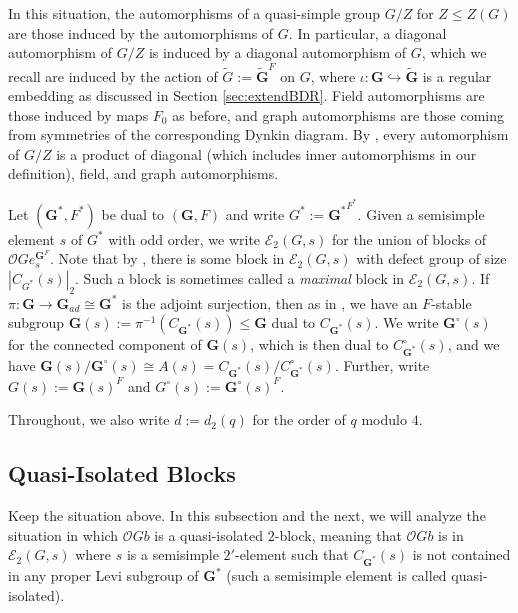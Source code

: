 \documentclass{amsart}
\theoremstyle{plain}\newtheorem{Theorem}{Theorem}[section]
\theoremstyle{plain}\newtheorem{Conjecture}[Theorem]{Conjecture}
\theoremstyle{plain}\newtheorem{Corollary}[Theorem]{Corollary}
\theoremstyle{plain}\newtheorem{Lemma}[Theorem]{Lemma}
\theoremstyle{plain}\newtheorem{Proposition}[Theorem]{Proposition}
\theoremstyle{definition}\newtheorem{Definition}[Theorem]{Definition}
\theoremstyle{definition}\newtheorem{Example}[Theorem]{Example}
\theoremstyle{definition}\newtheorem{Examples}[Theorem]{Examples}
\theoremstyle{definition}\newtheorem{Exercise}[Theorem]{Exercise}
\theoremstyle{definition}\newtheorem{Notation}[Theorem]{Notation}
\theoremstyle{definition}\newtheorem{Remark}[Theorem]{Remark}
\theoremstyle{definition}\newtheorem{Remarks}[Theorem]{Remarks}
\def\CO{{\mathcal{O}}}    \def\OPE{{\mathcal{O}(P\rtimes E)}}
\newcommand{\bG}{{\mathbf{G}}}
\newcommand{\wt}{\widetilde}
\newcommand{\cent} {C}
\newcommand{\zent} {Z}
\numberwithin{equation}{section}
\begin{document}
In this situation, the automorphisms of a quasi-simple group $G/Z$ for $Z\leq \zent(G)$ are those induced by the automorphisms of $G$. In particular, a diagonal automorphism of $G/Z$ is induced by a diagonal automorphism of $G$, which we recall are induced by the action of $\wt{G}:=\wt\bG^F$ on $G$, where $\iota\colon\bG\hookrightarrow\wt\bG$ is a regular embedding as discussed in Section \ref{sec:extendBDR}.
Field automorphisms are those induced by maps $F_0$ as before, and graph automorphisms are those coming from symmetries of the corresponding Dynkin diagram. 
By \cite[Thm.~2.5.12]{GLS3}, every automorphism of $G/Z$ is a product of  diagonal (which includes inner automorphisms in our definition), field, and graph automorphisms.



Let $(\bG^\ast, F^\ast)$ be dual to $(\bG, F)$ and write $G^\ast:={\bG^\ast}^{F^\ast}$. Given a semisimple element $s$ of $G^\ast$ with odd order, we write $\mathcal{E}_2(G, s)$ for the union of blocks of $\CO G e_s^{\bG^F}$. 
Note that by \cite[Prop.~2.6]{KM13}, there is some block in $\mathcal{E}_2(G, s)$ with defect group of size $|\cent_{G^\ast}(s)|_2$. Such a block is sometimes called a \emph{maximal} block in $\mathcal{E}_2(G, s)$. If $\pi\colon \bG\rightarrow\bG_{ad}\cong \bG^\ast$ is the adjoint surjection, then as in \cite[Sec.~2.2]{Ruh25}, we have an $F$-stable subgroup $\bG(s):=\pi^{-1}(\cent_{\bG^\ast}(s))\leq \bG$ dual to $\cent_{\bG^\ast}(s)$. We write $\bG^\circ(s)$ for the connected component of $\bG(s)$, which is then dual to $\cent_{\bG^\ast}^\circ(s)$, and we have $\bG(s)/\bG^\circ(s)\cong A(s)=\cent_{\bG^\ast}(s)/\cent_{\bG^\ast}^\circ(s)$. Further, write $G(s):=\bG(s)^F$ and $G^\circ(s):=\bG^\circ(s)^F$. 

Throughout, we also write $d:=d_2(q)$ for the order of $q$ modulo $4$.

\subsection{Quasi-Isolated Blocks}\label{sec:quasiisol}

Keep the situation above. In this subsection and the next, we will  analyze the situation in which $\CO G b$ is a quasi-isolated $2$-block, meaning that $\CO G b$ is in $\mathcal{E}_2(G,s)$ where $s$ is a semisimple $2'$-element such that $\cent_{\bG^\ast}(s)$ is not contained in any proper Levi subgroup  of $\bG^\ast$ (such a semisimple element is called quasi-isolated).
\end{document}

